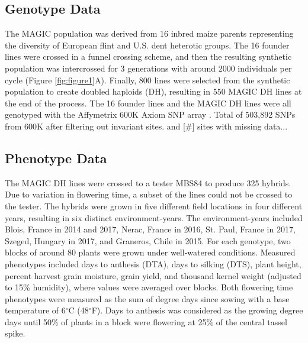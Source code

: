 \documentclass[article,9pt,twocolumn,twoside]{rilabRxiv}
\begin{document}
\subsection{Genotype Data}
The MAGIC population was derived from 16 inbred maize parents representing the
 diversity of European flint and U.S. dent heterotic groups. The 16 founder
  lines were crossed in a funnel crossing scheme, and then the resulting
   synthetic population was intercrossed for 3 generations with around 2000
    individuals per cycle (Figure \ref{fig:figure1}A). Finally, 800 lines were selected from the synthetic
     population to create doubled haploids (DH), resulting in 550 MAGIC DH
      lines at the end of the process. The 16 founder lines and the MAGIC DH
       lines were all genotyped with the Affymetrix 600K Axiom SNP array \citep{RN13}. %
Total of 503,892 SNPs from 600K after filtering out invariant sites.  and [#] sites with missing data...

\subsection{Phenotype Data}
The MAGIC DH lines were crossed to a tester MBS84 to produce 325 hybrids.
 Due to variation in flowering time, a subset of the lines could not be crossed
  to the tester. The hybrids were grown in five different field locations in
  four different years, resulting in six distinct environment-years. The environment-years
  included Blois, France in 2014 and 2017, Nerac, France in 2016, St. Paul, France in 2017,
  Szeged, Hungary in 2017, and Graneros, Chile in 2015.
   For each genotype, two blocks of around 80 plants were grown under
   well-watered conditions. Measured phenotypes included days to anthesis (DTA),
    days to silking (DTS), plant height, percent harvest grain moisture, grain
     yield, and thousand kernel weight (adjusted to 15\% humidity), where values
      were averaged over blocks. Both flowering time phenotypes were measured as
       the sum of degree days since sowing with a base temperature of
        6$^{\circ}$C (48$^{\circ}$F). Days to anthesis was considered as the
         growing degree days until 50\% of plants in a block were flowering at
          25\% of the central tassel spike.
\end{document}
